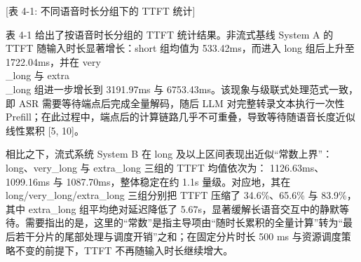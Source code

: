 \documentclass[UTF8,a4paper,12pt]{ctexart}
\begin{document}
\begin{table}[H]
\centering
\setlength{\tabcolsep}{4pt}
\renewcommand{\arraystretch}{1.2}
\scriptsize
{}
\end{table}


[表 4-1: 不同语音时长分组下的 TTFT 统计]

表 4-1 给出了按语音时长分组的 TTFT 统计结果。非流式基线 System A 的 TTFT 随输入时长显著增长：short 组均值为 533.42ms，而进入 long 组后上升至 1722.04ms，并在 very\\_long 与 extra\\_long 组进一步增长到 3191.97ms 与 6753.43ms。该现象与级联式处理范式一致，即 ASR 需要等待端点后完成全量解码，随后 LLM 对完整转录文本执行一次性 Prefill；在此过程中，端点后的计算链路几乎不可重叠，导致等待随语音长度近似线性累积 [5, 10]。

相比之下，流式系统 System B 在 long 及以上区间表现出近似“常数上界”：long、very\_long 与 extra\_long 三组的 TTFT 均值依次为： 1126.63ms、1099.16ms 与 1087.70ms，整体稳定在约 1.1s 量级。对应地，其在 long/very\_long/extra\_long 三组分别把 TTFT 压缩了 34.6\%、65.6\% 与 83.9\%，其中 extra\_long 组平均绝对延迟降低了 5.67s，显著缓解长语音交互中的静默等待。需要指出的是，这里的“常数”是指主导项由“随时长累积的全量计算”转为“最后若干分片的尾部处理与调度开销”之和；在固定分片时长 500 ms 与资源调度策略不变的前提下，TTFT 不再随输入时长继续增大。
\end{document}

